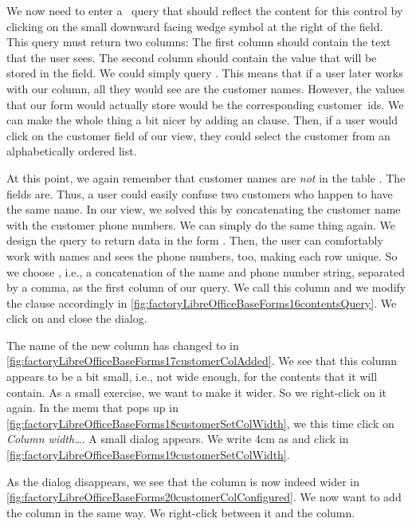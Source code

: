 We now need to enter a \sql\ query that should reflect the content for this control by clicking on the small downward facing wedge symbol at the right of the  field.
This query must return two columns:
The first column should contain the text that the user sees.
The second column should contain the value that will be stored in the  field.
We could simply query .
This means that if a user later works with our column, all they would see are the customer names.
However, the values that our form would actually store would be the corresponding customer~ids.
We can make the whole thing a bit nicer by adding an  clause.
Then, if a user would click on the customer field of our view, they could select the customer from an alphabetically ordered list.

At this point, we again remember that customer names are \emph{not}  in the table .
The  fields are.
Thus, a user could easily confuse two customers who happen to have the same name.
In our  view, we solved this by concatenating the customer name with the customer phone numbers.
We can simply do the same thing again.
We design the query to return data in the form .
Then, the user can comfortably work with names and sees the phone numbers, too, making each row unique.
So we choose \sqlIdx{\textbar\textbar}, i.e., a concatenation of the name and phone number string, separated by a comma, as the first column of our query.
We call this column  and we modify the  clause accordingly in \cref{fig:factoryLibreOfficeBaseForms16contentsQuery}.
We click on  and close the dialog.

The name of the new column has changed to  in \cref{fig:factoryLibreOfficeBaseForms17customerColAdded}.
We see that this column appears to be a bit small, i.e., not wide enough, for the contents that it will contain.
As a small exercise, we want to make it wider.
So we right-click on it again.
In the menu that pops up in \cref{fig:factoryLibreOfficeBaseForms18customerSetColWidth}, we this time click on \emph{Column width\dots}.
A small dialog appears.
We write 4cm as  and click  in \cref{fig:factoryLibreOfficeBaseForms19customerSetColWidth}.

As the dialog disappears, we see that the column is now indeed wider in \cref{fig:factoryLibreOfficeBaseForms20customerColConfigured}.
We now want to add the  column in the same way.
We right-click between it and the  column.

